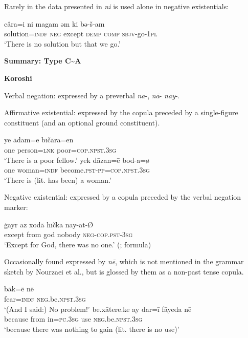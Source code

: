 \documentclass[output=paper]{langsci/langscibook}
\begin{document}
\begin{unindented}
Rarely in the data presented in \citealt{Paul2011} \textit{ni} is used alone in negative existentials:
%
\begin{exe}\ex
    \gll câra=i ni magam əm ki bə-š-am \\
solution=\textsc{indf} \textsc{neg} except \textsc{demp} \textsc{comp} \textsc{sbjv}-go-\textsc{1pl} \\
    \glt `There is no solution but that we go.' \citep[214]{Paul2011}  
    \end{exe}

\textbf{Summary: Type C{\textasciitilde}A}

\textbf{Koroshi} \parencite{NourzaeiJahani2015}

Verbal negation: expressed by a preverbal \textit{na}-, \textit{nā}- \textit{nay}-.

Affirmative existential: expressed by the copula preceded by a single-figure constituent (and an optional ground constituent). 
%
\begin{exe}\ex \gll ye ādam=e bīčāra=en \\
one person=\textsc{lnk}   poor=\textsc{cop.npst.3sg} \\
    \glt `There is a poor fellow.' \parencite[31]{NourzaeiJahani2015}
\ex \gll yek dāzan=ē bod-a=ø \\
one woman=\textsc{indf} become.\textsc{pst-pp=cop.npst.3sg} \\
    \glt `There is (lit. has been) a woman.' \parencite[90]{NourzaeiJahani2015}
    \end{exe} 
%
Negative existential: expressed by a copula preceded by the verbal negation marker: 
%
\begin{exe}\ex \gll ġayr az xodā hīčka nay-at-Ø \\
except from god   nobody \textsc{neg-cop.pst-3sg} \\
    \glt `Except for God, there was no one.'
(\citealt[123]{NourzaeiJahani2015}; formula)
    \end{exe}
%
Occasionally found expressed by \textit{nē}, which is not mentioned in the grammar sketch by Nourzaei et al., but is glossed by them as a non-past tense copula.
%
\begin{exe}\ex \gll bāk=ē nē \\
fear=\textsc{indf}    \textsc{neg}.be.\textsc{npst.3sg} \\
    \glt `(And I said:) No problem!' \parencite[149]{NourzaeiJahani2015}
\ex \gll be.xātere.ke ay dar=ī fāyeda nē \\
because from in=\textsc{pc}.\textsc{3sg} use \textsc{neg}.be.\textsc{npst.3sg} \\
    \glt `because there was nothing to gain (lit. there is no use)'
\parencite[144]{NourzaeiJahani2015}
    \end{exe}


\end{unindented}
\end{document}
